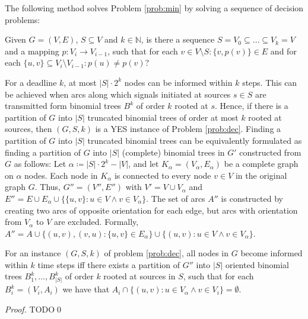 The following method solves Problem \ref{prob:min} by solving a sequence of decision problems:
\begin{problem}
\label{prob:dec}
Given $G=(V,E)$, $S\subseteq V$ and $k\in \mathbb{N}$, is there a sequence $S=V_0\subseteq\dots\subseteq V_k=V$ and a mapping $p:V_i\to V_{i-1}$, such that for each $v\in V\setminus S:\{v,p(v)\}\in E$ and for each $\{u,v\}\subseteq V_i\setminus V_{i-1}: p(u)\neq p(v)$?
\end{problem}
For a deadline $k$, at most $|S|\cdot 2^k$ nodes can be informed within $k$ steps. 
This can be achieved when arcs along which signals initiated at sources $s\in S$ are transmitted form binomial trees $B^k$ of order $k$ rooted at $s$.
Hence, if there is a partition of $G$ into $|S|$ truncated binomial trees of order at most $k$ rooted at sources, then $(G,S,k)$ is a YES instance of Problem \ref{prob:dec}.
Finding a partition of $G$ into $|S|$ truncated binomial trees can be equivalently formulated as finding a partition of $G$ into $|S|$ (complete) binomial trees in $G'$ constructed from $G$ as follows:
Let $\alpha\coloneqq |S|\cdot 2^k-|V|$, and let $K_\alpha=(V_\alpha,E_\alpha)$ be a complete graph on $\alpha$ nodes.
Each node in $K_\alpha$ is connected to every node $v\in V$ in the original graph $G$.
Thus, $G''=(V'',E'')$ with $V'=V\cup V_\alpha$ and $E''=E\cup E_\alpha\cup \{\{u,v\}: u\in V \wedge v\in V_\alpha\}$.
The set of arcs $A''$ is constructed by creating two arcs of opposite orientation for each edge, but arcs with orientation from $V_\alpha$ to $V$ are excluded. 
Formally, $A''=A\cup\{(u,v),(v,u): \{u,v\}\in E_\alpha\}\cup\{(u,v):u\in V \wedge v\in V_\alpha\}$.
\begin{lemma}
\label{lem:probeq}
For an instance $(G,S,k)$ of problem \ref{prob:dec}, all nodes in $G$ become informed within $k$ time steps iff 
there exists a partition of $G''$ into $|S|$ oriented binomial trees $B^k_1,\dots,B^k_{|S|}$ of order $k$ rooted at sources in $S$,
such that for each $B^k_i=(V_i,A_i)$ we have that $A_i\cap\{(u,v):u \in V_\alpha \wedge v\in V_i\}=\emptyset$. 
\end{lemma}
\begin{proof}
TODO\qed
\end{proof}

